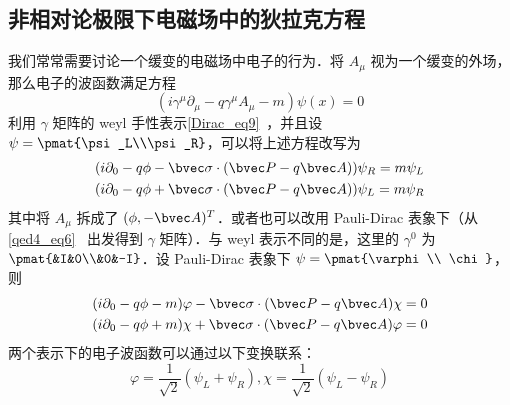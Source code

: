 \subsection{非相对论极限下电磁场中的狄拉克方程}\label{DiracE_sub1}
我们常常需要讨论一个缓变的电磁场中电子的行为．将 $A_\mu$ 视为一个缓变的外场，那么电子的波函数满足方程
\begin{equation}\label{DiracE_eq4}
(i\gamma^\mu \partial_\mu -q\gamma^\mu A_\mu - m)\psi(x)=0
\end{equation}
利用 $\gamma$ 矩阵的 weyl 手性表示\autoref{Dirac_eq9}~，并且设 $\psi = \pmat{\psi_L\\\psi_R}$，可以将上述方程改写为
\begin{equation}
\begin{aligned}
&(i\partial_0 - q\phi-\bvec \sigma\cdot (\bvec P-q\bvec A))\psi_R=m\psi_L\\
&(i\partial_0-q\phi+\bvec \sigma\cdot (\bvec P-q\bvec A))\psi_L = m\psi_R
\end{aligned}
\end{equation}
其中将 $A_\mu$ 拆成了 $(\phi,-\bvec A)^T$．或者也可以改用 Pauli-Dirac 表象下（从 \autoref{qed4_eq6}~ 出发得到 $\gamma$ 矩阵）．与 weyl 表示不同的是，这里的 $\gamma^0$ 为 $\pmat{&I&0\\&0&-I}$．设 Pauli-Dirac 表象下 $\psi=\pmat{\varphi\\ \chi}$，则
\begin{equation}\label{DiracE_eq1}
\begin{aligned}
&(i\partial_0-q\phi-m)\varphi-\bvec \sigma\cdot (\bvec P-q\bvec A)\chi=0\\
&(i\partial_0-q\phi+m)\chi+\bvec \sigma\cdot (\bvec P-q\bvec A)\varphi=0
\end{aligned}
\end{equation}
两个表示下的电子波函数可以通过以下变换联系：
\begin{equation}
\varphi = \frac{1}{\sqrt{2}}(\psi_L+\psi_R),\chi = \frac{1}{\sqrt{2}}(\psi_L-\psi_R)
\end{equation}

